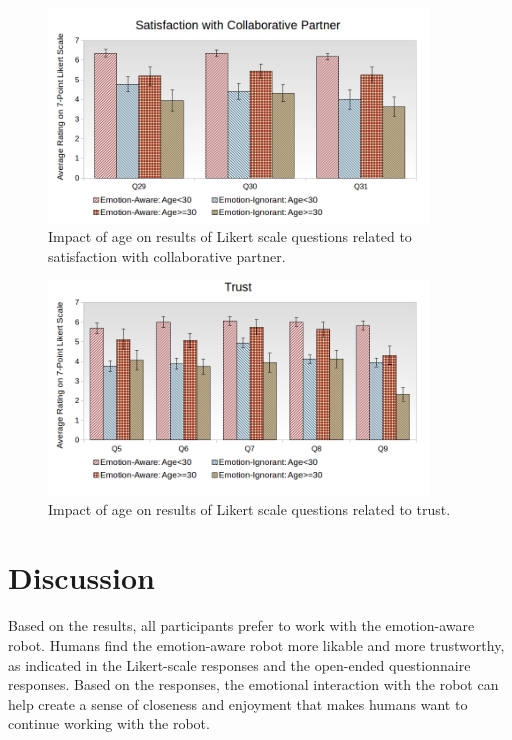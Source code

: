 \documentclass[12pt]{report}
\begin{document}
\begin{figure}[!h]
\centering
\includegraphics[width=0.9\textwidth]{figure/Age-Satisfaction.png}
\caption{\fontsize{10pt}{10pt}\selectfont Impact of age on results of Likert
scale questions related to satisfaction with collaborative partner.}
\label{fig:age-satisfaction}
\vspace*{10mm}
\end{figure}

\begin{figure}[!h]
\centering
\includegraphics[width=0.9\textwidth]{figure/Age-Trust.png}
\caption{\fontsize{10pt}{10pt}\selectfont Impact of age on results of Likert
scale questions related to trust.}
\label{fig:age-trust}
\end{figure}

\section{Discussion}
Based on the results, all participants prefer to work with the emotion-aware
robot. Humans find the emotion-aware robot more likable and more trustworthy, as
indicated in the Likert-scale responses and the open-ended questionnaire
responses. Based on the responses, the emotional interaction with the robot can
help create a sense of closeness and enjoyment that makes humans want to
continue working with the robot.
\end{document}
